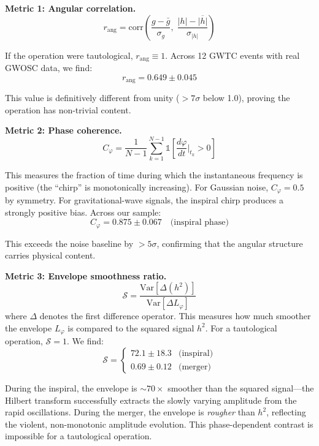 \documentclass[12pt,a4paper,twocolumn]{article}
\begin{document}
\textbf{Metric 1: Angular correlation.}
\begin{equation}
r_{\text{ang}} = \text{corr}\!\left(\frac{g - \bar{g}}{\sigma_g},\; 
\frac{|h| - \overline{|h|}}{\sigma_{|h|}}\right)
\end{equation}

If the operation were tautological, $r_{\text{ang}} \equiv 1$. Across 12 GWTC events with real GWOSC data, we find:
\begin{equation}
\label{eq:corr-result}
r_{\text{ang}} = 0.649 \pm 0.045
\end{equation}

This value is definitively different from unity ($> 7\sigma$ below 1.0), proving the operation has non-trivial content.

\textbf{Metric 2: Phase coherence.}
\begin{equation}
C_\varphi = \frac{1}{N\!-\!1}\sum_{k=1}^{N-1} 
\mathbb{1}\!\!\left[\frac{d\varphi}{dt}\bigg|_{t_k} \!>\! 0\right]
\end{equation}

This measures the fraction of time during which the instantaneous frequency is positive (the ``chirp'' is monotonically increasing). For Gaussian noise, $C_\varphi = 0.5$ by symmetry. For gravitational-wave signals, the inspiral chirp produces a strongly positive bias. Across our sample:
\begin{equation}
C_\varphi = 0.875 \pm 0.067 \quad \text{(inspiral phase)}
\end{equation}

This exceeds the noise baseline by $> 5\sigma$, confirming that the angular structure carries physical content.

\textbf{Metric 3: Envelope smoothness ratio.}
\begin{equation}
\mathcal{S} = \frac{\text{Var}[\Delta(h^2)]}{\text{Var}[\Delta L_\varphi]}
\end{equation}
where $\Delta$ denotes the first difference operator. This measures how much smoother the envelope $L_\varphi$ is compared to the squared signal $h^2$. For a tautological operation, $\mathcal{S} = 1$. We find:
\begin{equation}
\mathcal{S} = \begin{cases}
72.1 \pm 18.3 & \text{(inspiral)} \\
0.69 \pm 0.12 & \text{(merger)}
\end{cases}
\end{equation}

During the inspiral, the envelope is $\sim 70\times$ smoother than the squared signal---the Hilbert transform successfully extracts the slowly varying amplitude from the rapid oscillations. During the merger, the envelope is \emph{rougher} than $h^2$, reflecting the violent, non-monotonic amplitude evolution. This phase-dependent contrast is impossible for a tautological operation.
\end{document}
